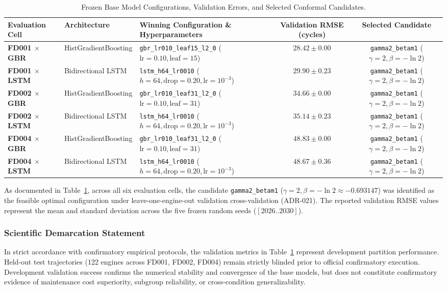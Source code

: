 \documentclass[12pt,a4paper]{article}
\begin{document}
\begin{table}[htbp]
\centering
\caption{Frozen Base Model Configurations, Validation Errors, and Selected Conformal Candidates.}
\label{tab:base_models}
\small
\begin{tabularx}{\textwidth}{llXcc}
\toprule
\textbf{Evaluation Cell} & \textbf{Architecture} & \textbf{Winning Configuration \& Hyperparameters} & \textbf{Validation RMSE (cycles)} & \textbf{Selected Candidate} \\
\midrule
\textbf{FD001 $\times$ GBR} & HistGradientBoosting & \texttt{gbr\_lr010\_leaf15\_l2\_0} ($\text{lr}=0.10, \text{leaf}=15$) & $28.42 \pm 0.00$ & \texttt{gamma2\_betam1} ($\gamma=2, \beta=-\ln 2$) \\
\textbf{FD001 $\times$ LSTM} & Bidirectional LSTM & \texttt{lstm\_h64\_lr0010} ($h=64, \text{drop}=0.20, \text{lr}=10^{-3}$) & $29.90 \pm 0.23$ & \texttt{gamma2\_betam1} ($\gamma=2, \beta=-\ln 2$) \\
\textbf{FD002 $\times$ GBR} & HistGradientBoosting & \texttt{gbr\_lr010\_leaf31\_l2\_0} ($\text{lr}=0.10, \text{leaf}=31$) & $34.66 \pm 0.00$ & \texttt{gamma2\_betam1} ($\gamma=2, \beta=-\ln 2$) \\
\textbf{FD002 $\times$ LSTM} & Bidirectional LSTM & \texttt{lstm\_h64\_lr0010} ($h=64, \text{drop}=0.20, \text{lr}=10^{-3}$) & $35.14 \pm 0.23$ & \texttt{gamma2\_betam1} ($\gamma=2, \beta=-\ln 2$) \\
\textbf{FD004 $\times$ GBR} & HistGradientBoosting & \texttt{gbr\_lr010\_leaf31\_l2\_0} ($\text{lr}=0.10, \text{leaf}=31$) & $48.83 \pm 0.00$ & \texttt{gamma2\_betam1} ($\gamma=2, \beta=-\ln 2$) \\
\textbf{FD004 $\times$ LSTM} & Bidirectional LSTM & \texttt{lstm\_h64\_lr0010} ($h=64, \text{drop}=0.20, \text{lr}=10^{-3}$) & $48.67 \pm 0.36$ & \texttt{gamma2\_betam1} ($\gamma=2, \beta=-\ln 2$) \\
\bottomrule
\end{tabularx}
\end{table}

As documented in Table~\ref{tab:base_models}, across all six evaluation cells, the candidate \texttt{gamma2\_betam1} ($\gamma = 2, \beta = -\ln 2 \approx -0.693147$) was identified as the feasible optimal configuration under leave-one-engine-out validation cross-validation (ADR-021). The reported validation RMSE values represent the mean and standard deviation across the five frozen random seeds ($[2026..2030]$).

\subsubsection*{Scientific Demarcation Statement}
In strict accordance with confirmatory empirical protocols, the validation metrics in Table~\ref{tab:base_models} represent development partition performance. Held-out test trajectories (122 engines across FD001, FD002, FD004) remain strictly blinded prior to official confirmatory execution. Development validation success confirms the numerical stability and convergence of the base models, but does not constitute confirmatory evidence of maintenance cost superiority, subgroup reliability, or cross-condition generalizability.
\end{document}
